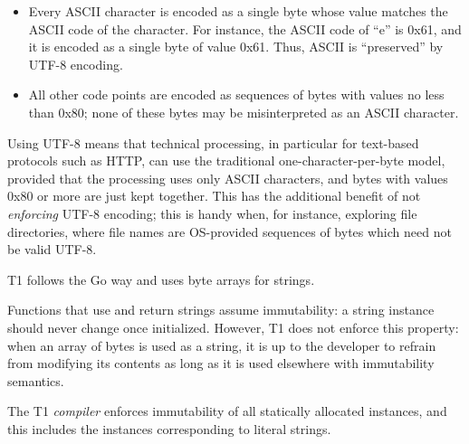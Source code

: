 \begin{rationale}
\begin{itemize}
    \item Every ASCII character is encoded as a single byte whose value
    matches the ASCII code of the character. For instance, the ASCII
    code of ``e'' is 0x61, and it is encoded as a single byte of value
    0x61. Thus, ASCII is ``preserved'' by UTF-8 encoding.

    \item All other code points are encoded as sequences of bytes
    with values no less than 0x80; none of these bytes may be
    misinterpreted as an ASCII character.

\end{itemize}
Using UTF-8 means that technical processing, in particular for
text-based protocols such as HTTP, can use the traditional
one-character-per-byte model, provided that the processing uses only
ASCII characters, and bytes with values 0x80 or more are just kept
together. This has the additional benefit of not \emph{enforcing} UTF-8
encoding; this is handy when, for instance, exploring file directories,
where file names are OS-provided sequences of bytes which need not be
valid UTF-8.

T1 follows the Go way and uses byte arrays for strings.
\end{rationale}

Functions that use and return strings assume immutability: a string
instance should never change once initialized. However, T1 does not
enforce this property: when an array of bytes is used as a string, it is
up to the developer to refrain from modifying its contents as long as it
is used elsewhere with immutability semantics.

The T1 \emph{compiler} enforces immutability of all statically allocated
instances, and this includes the instances corresponding to literal
strings.

